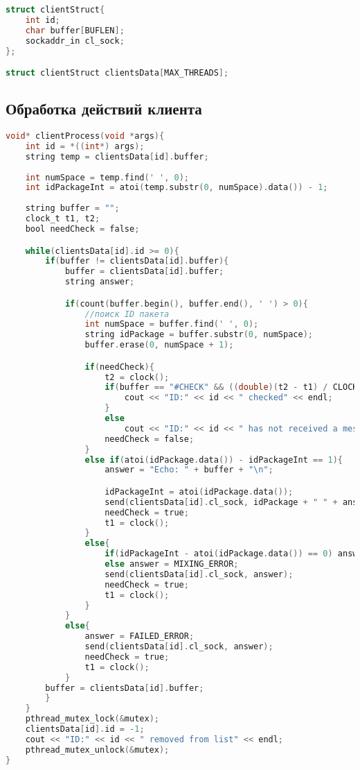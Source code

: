 \begin{append}
\begin{lstlisting}[language=C, label=lst:createserver]
struct clientStruct{
    int id;
    char buffer[BUFLEN];
    sockaddr_in cl_sock;
};

struct clientStruct clientsData[MAX_THREADS];
\end{lstlisting}

\subsection{Обработка действий клиента} \label{app:clientprocessudp}

\begin{lstlisting}[language=C, label=lst:createserver]
void* clientProcess(void *args){
    int id = *((int*) args);
    string temp = clientsData[id].buffer;
    
    int numSpace = temp.find(' ', 0);
    int idPackageInt = atoi(temp.substr(0, numSpace).data()) - 1;
    
    string buffer = "";
    clock_t t1, t2;
    bool needCheck = false;

    while(clientsData[id].id >= 0){
        if(buffer != clientsData[id].buffer){
            buffer = clientsData[id].buffer;
            string answer;

            if(count(buffer.begin(), buffer.end(), ' ') > 0){
                //поиск ID пакета
                int numSpace = buffer.find(' ', 0);
                string idPackage = buffer.substr(0, numSpace);
                buffer.erase(0, numSpace + 1);

                if(needCheck){
                    t2 = clock();
                    if(buffer == "#CHECK" && ((double)(t2 - t1) / CLOCKS_PER_SEC) < 3){
                        cout << "ID:" << id << " checked" << endl;
                    }
                    else
                        cout << "ID:" << id << " has not received a message" << endl;
                    needCheck = false;
                }
                else if(atoi(idPackage.data()) - idPackageInt == 1){
                    answer = "Echo: " + buffer + "\n";

                    idPackageInt = atoi(idPackage.data());
                    send(clientsData[id].cl_sock, idPackage + " " + answer);
                    needCheck = true;
                    t1 = clock();
                }
                else{
                    if(idPackageInt - atoi(idPackage.data()) == 0) answer = SAME_ERROR;
                    else answer = MIXING_ERROR;
                    send(clientsData[id].cl_sock, answer);
                    needCheck = true;
                    t1 = clock();
                }
            }
            else{
                answer = FAILED_ERROR;
                send(clientsData[id].cl_sock, answer);
                needCheck = true;
                t1 = clock();
            }
        buffer = clientsData[id].buffer;
        }
    }
    pthread_mutex_lock(&mutex);
    clientsData[id].id = -1;
    cout << "ID:" << id << " removed from list" << endl;
    pthread_mutex_unlock(&mutex);
}
\end{lstlisting}


\end{append}
